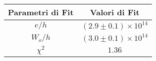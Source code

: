 \begin{tabular}{cc}
\hline
	Parametri di Fit & Valori di Fit\\ 
\hline
	$e/h$ & $(2.9\pm0.1)\times 10^{14}$ \\
	$W_o/h$ & $(3.0\pm0.1)\times 10^{14}$ \\
	$\chi^2$ & $1.36$ \\
\hline
\end{tabular}

